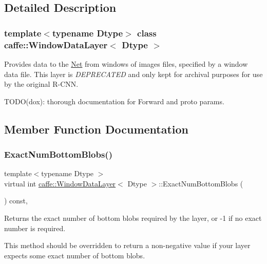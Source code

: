 \subsection{Detailed Description}
\subsubsection*{template$<$typename Dtype$>$\newline
class caffe\+::\+Window\+Data\+Layer$<$ Dtype $>$}

Provides data to the \mbox{\hyperlink{classcaffe_1_1_net}{Net}} from windows of images files, specified by a window data file. This layer is {\itshape D\+E\+P\+R\+E\+C\+A\+T\+ED} and only kept for archival purposes for use by the original R-\/\+C\+NN. 

T\+O\+D\+O(dox)\+: thorough documentation for Forward and proto params. 

\subsection{Member Function Documentation}
\mbox{\label{classcaffe_1_1_window_data_layer_ac982c8170a7f899366321412a7bb91d7}} 
\subsubsection{\texorpdfstring{Exact\+Num\+Bottom\+Blobs()}{ExactNumBottomBlobs()}\hspace{0.1cm}{\footnotesize\ttfamily [1/2]}}
{\footnotesize\ttfamily template$<$typename Dtype $>$ \\
virtual int \mbox{\hyperlink{classcaffe_1_1_window_data_layer}{caffe\+::\+Window\+Data\+Layer}}$<$ Dtype $>$\+::Exact\+Num\+Bottom\+Blobs (\begin{DoxyParamCaption}{ }\end{DoxyParamCaption}) const\hspace{0.3cm}{\ttfamily [inline]}, {\ttfamily [virtual]}}



Returns the exact number of bottom blobs required by the layer, or -\/1 if no exact number is required. 

This method should be overridden to return a non-\/negative value if your layer expects some exact number of bottom blobs. 

